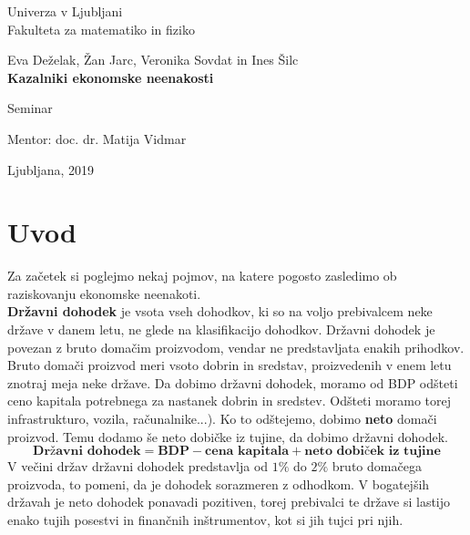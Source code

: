 \documentclass[a4paper,12 pt]{article}
\begin{document}
\begin{titlepage}
\begin{center}

\large
Univerza v Ljubljani\\
\normalsize
Fakulteta za matematiko in fiziko\\

\vspace{3 cm} 

\large
Eva Deželak, Žan Jarc, Veronika Sovdat in Ines Šilc\\

\vspace{0.5cm}
\LARGE
\textbf{Kazalniki ekonomske neenakosti}

\vspace{0.5 cm}
\normalsize
Seminar

\vspace{1.5cm}
\normalsize
Mentor: doc. dr. Matija Vidmar

\vspace{3cm}


\vfill

\large Ljubljana, 2019

\end{center}
\end{titlepage}

\newpage

\tableofcontents
\vspace{20mm}

\newpage

\section[Uvod]{Uvod}

Za začetek si poglejmo nekaj pojmov, na katere pogosto zasledimo ob raziskovanju ekonomske neenakoti.
\\ 

\textbf{Državni dohodek} je vsota vseh dohodkov, ki so na voljo prebivalcem neke države v danem letu, ne glede na klasifikacijo dohodkov. Državni dohodek je povezan z bruto domačim proizvodom, vendar ne predstavljata enakih prihodkov. Bruto domači proizvod meri vsoto dobrin in sredstav, proizvedenih v enem letu znotraj meja neke države. Da dobimo državni dohodek, moramo od BDP odšteti ceno kapitala potrebnega za nastanek dobrin in sredstev. Odšteti moramo torej infrastrukturo, vozila, računalnike...). Ko to odštejemo, dobimo \textbf{neto} domači proizvod. Temu dodamo še neto dobičke iz tujine, da dobimo državni dohodek.
$$
\textbf{Državni dohodek} = \textbf{BDP} - \textbf{cena kapitala} + \textbf{neto dobiček iz tujine}
$$
V večini držav državni dohodek predstavlja od $1\%$ do $2\%$ bruto domačega proizvoda, to pomeni, da je dohodek sorazmeren z odhodkom. V bogatejših državah je neto dohodek ponavadi pozitiven, torej prebivalci te države si lastijo enako tujih posestvi in finančnih inštrumentov, kot si jih tujci pri njih.
\end{document}
